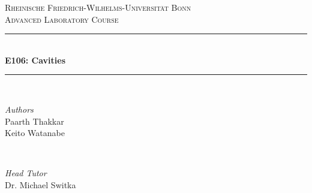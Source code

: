 \documentclass[a4paper]{report}
\numberwithin{equation}{section}
\begin{document}

\begin{titlepage} %
	\newcommand{\HRule}{\rule{\linewidth}{0.5mm}} %
	
	\center %
	
	
	\textsc{\LARGE Rheinische Friedrich-Wilhelms-Universit\"at Bonn }\\[1.5cm] %
	
	
	\textsc{\large Advanced Laboratory Course}\\[0.5cm] %
	
	
	\HRule\\[0.4cm]
	
	{\huge\bfseries E106: Cavities}\\[0.4cm] %
	
	\HRule\\[1.5cm]
	
	
	\begin{minipage}{0.4\textwidth}
		\begin{flushleft}
			\large
			\textit{Authors}\\
			Paarth Thakkar \\
			Keito Watanabe
		\end{flushleft}
	\end{minipage}
	~
	\begin{minipage}{0.4\textwidth}
		\begin{flushright}
			\large
			\textit{Head Tutor}\\
			Dr. Michael Switka
		\end{flushright}
	\end{minipage}
	

\end{titlepage}
\end{document}
